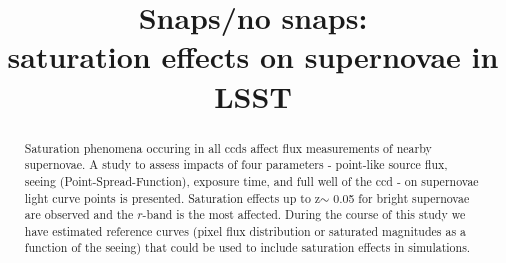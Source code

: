 \documentclass[\docopts]{\docclass}
\begin{document}
\tableofcontents

\title{Snaps/no snaps: \\ saturation effects on supernovae in LSST}

\maketitlepre

\begin{abstract}

  Saturation phenomena occuring in all ccds affect flux measurements of nearby supernovae. A study to assess impacts of four parameters - point-like source flux, seeing (Point-Spread-Function), exposure time, and full well of the ccd - on supernovae light curve points is presented. Saturation effects up to z$\sim$ 0.05 for bright supernovae are observed and the $r$-band is the most affected. During the course of this study we have estimated reference curves (pixel flux distribution or saturated magnitudes as a function of the seeing) that could be used to include saturation effects in simulations. 

\end{abstract}

\dockeys{}

\maketitlepost

\end{document}

